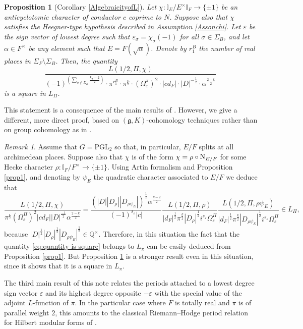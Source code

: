 \documentclass{amsart}
\newtheorem{proposition}[theorem]{Proposition}
\theoremstyle{definition}
\theoremstyle{remark}
\newtheorem{remark}[theorem]{Remark}
\numberwithin{equation}{section}
\newcommand{\PGL}{{\mathrm{PGL}}}
\newcommand{\Q}{{\mathbb Q}}
\newcommand{\I}{{\mathbb I}}
\begin{document}
\begin{proposition}[Corollary \ref{AlgebraicityofL}]\label{prop2}
    Let  $\chi:\I_E/E^\times\I_F\rightarrow \{\pm 1\}$ be an anticyclotomic character of conductor $c$ coprime to $N$. Suppose also that $\chi$  satisfies the Heegner-type hypothesis described in Assumption \ref{Assonchi}. Let $\varepsilon$ be the sign vector   of lowest degree  such that $\varepsilon_\sigma=\chi_{\sigma}(-1)$ for all $\sigma \in \Sigma_B$, and let $\alpha\in F^\times$ be any element such that $E=F(\sqrt{\alpha})$. Denote by $r_1^B$ the number of real places in $\Sigma_F\setminus\Sigma_B$. Then, the quantity 
    \begin{equation}\label{eq:quantity is square}
\frac{L(1/2,\Pi,\chi)}{(-1)^{\left(\sum_{\sigma\not\in\Sigma_B}\frac{k_\sigma-2}{2}\right)}\cdot\pi^{r_1^B}\cdot\pi^{\underline k}\cdot(\Omega^\pi_\varepsilon)^{2}\cdot|cd_F|\cdot|D|^{-\frac{1}{2}} \cdot \alpha^{\frac{2-\underline{k}}{2}}}\,
\end{equation}
is a square in $L_\Pi$.
\end{proposition}
This statement is a consequence of the main results of \cite{preprintsanti2}. However, we give a different, more direct proof, based on $(\mathfrak{g},K)$-cohomology techniques rather than on group cohomology as in  \cite{preprintsanti2}.
\begin{remark}
Assume that $G=\PGL_2$ so that, in particular, $E/F$ splits at all archimedean places. Suppose also that $\chi$ is of the form $\chi=\rho\circ{\rm N}_{E/F}$ for some Hecke character $\rho:\I_F/F^\times\rightarrow\{\pm 1\}$. Using Artin formalism and Proposition \ref{prop1},  and denoting by $\psi_E$ the quadratic character associated to $E/F$ we deduce that
\[
\frac{L(1/2,\Pi,\chi)}{\pi^{\underline k}(\Omega_\varepsilon^\Pi)^{2}|cd_F||D|^{\frac{-1}{2}} \alpha^{\frac{2-\underline{k}}{2}}}=\frac{(|D||D_\rho||D_{\rho\psi_E}|)^{\frac{1}{2}}\alpha^{\frac{{\underline k}-2}{2}}}{(-1)^{s_\varepsilon}|c|}\frac{L(1/2,\Pi, \rho)}{|d_F|^{\frac{1}{2}}\pi^{\frac{\underline k}{2}} |D_\rho|^{\frac{1}{2}} i^{s_\varepsilon} \Omega_\varepsilon^\Pi}\frac{L(1/2,\Pi, \rho\psi_E)}{|d_F|^{\frac{1}{2}}\pi^{\frac{\underline k}{2}} |D_{\rho\psi_E}|^{\frac{1}{2}}i^{s_\varepsilon} \Omega_\varepsilon^\Pi}\in L_\Pi,
\]
because $|D|^{\frac{1}{2}}|D_\rho|^{\frac{1}{2}}|D_{\rho\psi_E}|^{\frac{1}{2}}\in\Q^\times$. Therefore, in this situation the fact that the quantity \eqref{eq:quantity is square} belongs to $L_\pi$ can be easily deduced from Proposition \ref{prop1}. But Proposition \ref{prop2} is a stronger result even in this situation, since it shows that it is a square in $L_\pi$.
\end{remark}
The third main result of this note relates the periods attached to a  lowest degree sign vector $\varepsilon$ and its  highest degree opposite $-\varepsilon$ with the special value of the adjoint $L$-function of $\pi$. In the particular case where $F$ is totally real and $\pi$ is of parallel weight $2$, this amounts to the classical Riemann--Hodge period relation for Hilbert modular forms of \cite[Theorem 2.4]{oda}.
\end{document}
